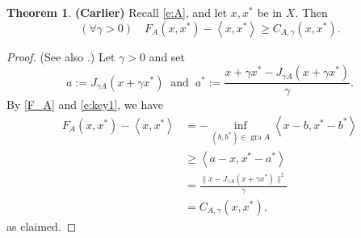 \documentclass[12pt]{article}
\newcommand{\scal}[2]{\left\langle{#1},{#2}  \right\rangle}
\theoremstyle{definition}
\newtheorem{theorem}{Theorem}[section]
\providecommand{\gr}{\operatorname{gra}}
\providecommand{\gr}{\operatorname{gra}}
\begin{document}
{\begin{theorem} {\bf (Carlier)}
\label{t:CarlierA}
Recall \cref{e:A}, and let $x,x^*$ be in $X$. 
Then 
\begin{equation}
(\forall \gamma>0)\quad
F_A(x,x^*)-\scal{x}{x^*} \geq C_{A,\gamma}(x,x^*). 
\end{equation}
\end{theorem}
\begin{proof}
(See also \cite[Section~2]{Carlier}.)
Let $\gamma>0$ and 
set 
\begin{equation}
a := J_{\gamma A}(x+\gamma x^*)
\;\;\text{and}\;\;
a^* := \frac{x+\gamma x^*-J_{\gamma A}(x+\gamma x^*)}{\gamma}.
\end{equation}
By \cref{F_A} and \cref{e:key1}, we have 
\begin{subequations}
\begin{align}
F_A(x,x^*) -  
\scal{x}{x^*} &= -\inf_{(b,b^*)\in\gr A}\scal{x-b}{x^*-b^*}\\
&\geq \scal{a-x}{x^*-a^*}\\
&=\frac{\|x-J_{\gamma A}(x+\gamma x^*)\|^2}{\gamma}\\
&=C_{A,\gamma}(x,x^*), 
\end{align}
\end{subequations}
as claimed. 
\end{proof}



}
\end{document}

